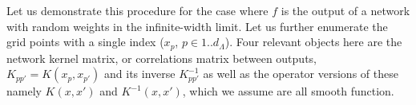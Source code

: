 Let us demonstrate this procedure for the case where $f$ is the output of a network with random weights in the infinite-width limit. Let us further enumerate the grid points with a single index (${x}_p$, $p \in 1..d_{\Lambda}$). Four relevant objects here are the network kernel matrix, or correlations matrix between outputs, $K_{pp'}=K({x}_p,{x}_{p'})$ and its inverse $K^{-1}_{pp'}$ as well as the operator versions of these namely $K({x},{x}')$ and $K^{-1}({x},{x}')$, which we assume are all smooth function.  


